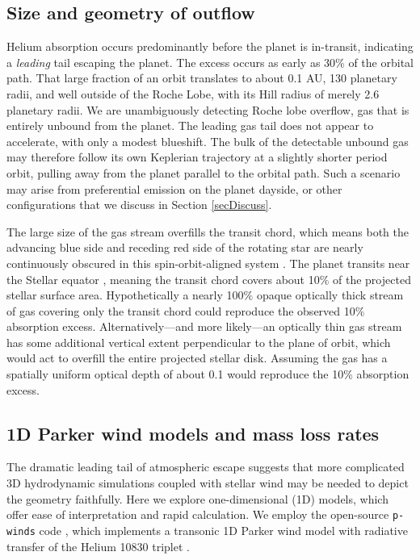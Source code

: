 \documentclass[twocolumn]{aastex631}
\begin{document}
\subsection{Size and geometry of outflow}
Helium absorption occurs predominantly before the planet is in-transit, indicating a \emph{leading} tail escaping the planet.  The excess occurs as early as 30\% of the orbital path.  That large fraction of an orbit translates to about 0.1 AU, 130 planetary radii, and well outside of the Roche Lobe, with its Hill radius of merely 2.6 planetary radii.  We are unambiguously detecting Roche lobe overflow, gas that is entirely unbound from the planet.  The leading gas tail does not appear to accelerate, with only a modest blueshift.  The bulk of the detectable unbound gas may therefore follow its own Keplerian trajectory at a slightly shorter period orbit, pulling away from the planet parallel to the orbital path.  Such a scenario may arise from preferential emission on the planet dayside, or other configurations that we discuss in Section \ref{secDiscuss}.

The large size of the gas stream overfills the transit chord, which means both the advancing blue side and receding red side of the rotating star are nearly continuously obscured in this spin-orbit-aligned system \citep{2017AJ....153..211Z}. The planet transits near the Stellar equator \citep{2017AJ....153..211Z}, meaning the transit chord covers about 10$\%$ of the projected stellar surface area.  Hypothetically a nearly 100$\%$ opaque optically thick stream of gas covering only the transit chord could reproduce the observed 10$\%$ absorption excess.  Alternatively---and more likely---an optically thin gas stream has some additional vertical extent perpendicular to the plane of orbit, which would act to overfill the entire projected stellar disk.  Assuming the gas has a spatially uniform optical depth of about 0.1 would reproduce the 10\% absorption excess.


\subsection{1D Parker wind models and mass loss rates}\label{pwinds}
The dramatic leading tail of atmospheric escape suggests that more complicated 3D hydrodynamic simulations coupled with stellar wind \citep{2022ApJ...926..226M} may be needed to depict the geometry faithfully.  Here we explore one-dimensional (1D) models, which offer ease of interpretation and rapid calculation.  We employ the open-source \texttt{p-winds} code \citep{2022A&A...659A..62D}, which implements a transonic 1D Parker wind model with radiative transfer of the Helium 10830 triplet \citep{2018ApJ...855L..11O,2020A&A...636A..13L}.
\end{document}
